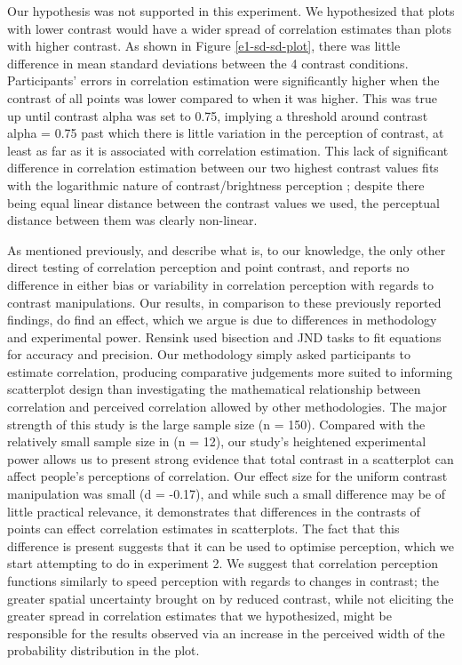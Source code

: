 \documentclass[preprint, 3p,
authoryear]{elsarticle} %
\begin{document}
Our hypothesis was not supported in this experiment. We hypothesized
that plots with lower contrast would have a wider spread of correlation
estimates than plots with higher contrast. As shown in Figure
\ref{e1-sd-sd-plot}, there was little difference in mean standard
deviations between the 4 contrast conditions. Participants' errors in
correlation estimation were significantly higher when the contrast of
all points was lower compared to when it was higher. This was true up
until contrast alpha was set to 0.75, implying a threshold around
contrast alpha = 0.75 past which there is little variation in the
perception of contrast, at least as far as it is associated with
correlation estimation. This lack of significant difference in
correlation estimation between our two highest contrast values fits with
the logarithmic nature of contrast/brightness perception
\citep{varshney_2013, fechner_1948}; despite there being equal linear
distance between the contrast values we used, the perceptual distance
between them was clearly non-linear.

As mentioned previously, \citet{rensink_2012} and \citet{rensink_2014}
describe what is, to our knowledge, the only other direct testing of
correlation perception and point contrast, and reports no difference in
either bias or variability in correlation perception with regards to
contrast manipulations. Our results, in comparison to these previously
reported findings, do find an effect, which we argue is due to
differences in methodology and experimental power. Rensink used
bisection and JND tasks to fit equations for accuracy and precision. Our
methodology simply asked participants to estimate correlation, producing
comparative judgements more suited to informing scatterplot design than
investigating the mathematical relationship between correlation and
perceived correlation allowed by other methodologies. The major strength
of this study is the large sample size (n = 150). Compared with the
relatively small sample size in \citet{rensink_2014} (n = 12), our
study's heightened experimental power allows us to present strong
evidence that total contrast in a scatterplot can affect people's
perceptions of correlation. Our effect size for the uniform contrast
manipulation was small (d = -0.17), and while such a small difference
may be of little practical relevance, it demonstrates that differences
in the contrasts of points can effect correlation estimates in
scatterplots. The fact that this difference is present suggests that it
can be used to optimise perception, which we start attempting to do in
experiment 2. We suggest that correlation perception functions similarly
to speed perception \citep{champion_2017} with regards to changes in
contrast; the greater spatial uncertainty brought on by reduced
contrast, while not eliciting the greater spread in correlation
estimates that we hypothesized, might be responsible for the results
observed via an increase in the perceived width of the probability
distribution in the plot.
\end{document}
